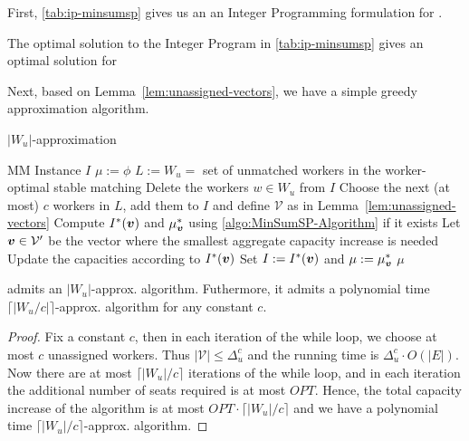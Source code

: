 First, \autoref{tab:ip-minsumsp} gives us an an Integer Programming formulation for \MinSumSP.

\begin{lemma}
  The optimal solution to the Integer Program in \autoref{tab:ip-minsumsp} gives an optimal solution for \MinSumSP
\end{lemma}

Next, based on Lemma~\ref{lem:unassigned-vectors}, we have a simple greedy approximation algorithm.

\begin{algorithm}
  \caption{$|W_u|$-approximation}
  \label{algo:MinSumSP-Approx}
  \begin{algorithmic}
    \REQUIRE MM Instance $I$
    \STATE $\mu := \phi$
    \STATE $L := W_u = $ set of unmatched workers in the worker-optimal stable matching
    \STATE Delete the workers $w \in W_u$ from $I$
    \STATE Choose the next (at most) $c$ workers in $L$, add them to $I$ and define $\mathcal{V}$ as in Lemma~\ref{lem:unassigned-vectors}
    \STATE Compute $I^*({\boldsymbol{v}})$ and $\mu^*_{\boldsymbol{v}}$ using \autoref{algo:MinSumSP-Algorithm} if it exists
    \ENDFOR
    \STATE Let ${\boldsymbol{v}} \in \mathcal{V}'$ be the vector where the smallest aggregate capacity increase is needed
    \STATE Update the capacities according to $I^*({\boldsymbol{v}})$
    \STATE Set $I := I^*({\boldsymbol{v}})$ and $\mu := \mu^*_{\boldsymbol{v}}$
    \ENDWHILE
    \RETURN $\mu$
  \end{algorithmic}
\end{algorithm}

\begin{theorem}
  \MinSumSP admits an $|W_u|$-approx. algorithm. Futhermore, it admits a polynomial time $\lceil |W_u/c| \rceil$-approx. algorithm for any constant $c$.
\end{theorem}

\begin{proof}
  Fix a constant $c$, then in each iteration of the while loop, we choose at most $c$ unassigned workers. Thus $|\mathcal{V}| \leq \Delta_u^c$ and the running time is $\Delta_u^c \cdot O(|E|)$. Now there are at most $\lceil |W_u|/c \rceil$ iterations of the while loop, and in each iteration the additional number of seats required is at most $OPT$. Hence, the total capacity increase of the algorithm is at most $OPT \cdot \lceil |W_u|/c \rceil$ and we have a polynomial time $\lceil |W_u|/c \rceil$-approx. algorithm.
\end{proof}

